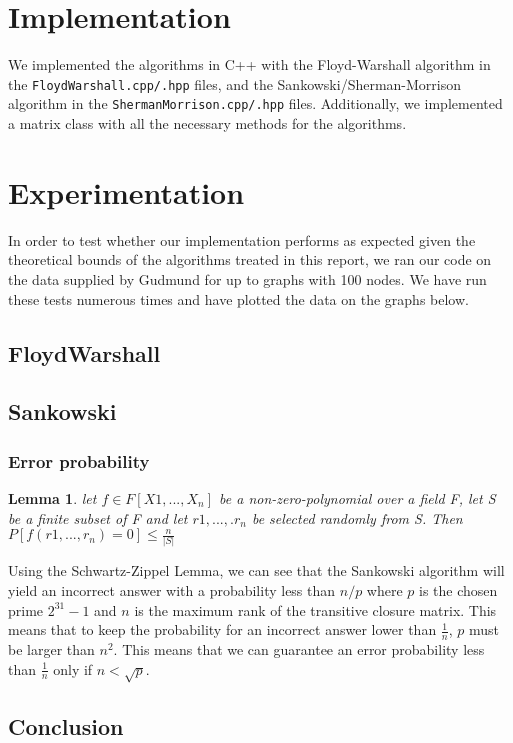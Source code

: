 \documentclass[a4paper,oneside,article]{memoir}
\newtheorem{Lemma}{Lemma}
\begin{document}
\section{Implementation}
We implemented the algorithms in C++ with the Floyd-Warshall algorithm
in the \texttt{FloydWarshall.cpp/.hpp} files, and the
Sankowski/Sherman-Morrison algorithm in the
\texttt{ShermanMorrison.cpp/.hpp} files. Additionally, we implemented
a matrix class with all the necessary methods for the algorithms.

\section{Experimentation}
In order to test whether our implementation performs as expected given
the theoretical bounds of the algorithms treated in this report, we
ran our code on the data supplied by Gudmund for up to graphs with 100 nodes.
We have run these tests numerous times and have plotted the data on the graphs below.


\subsection{FloydWarshall}

\subsection{Sankowski}

\subsubsection{Error probability}
\begin{Lemma}
let $f \in F[X1, ...,X_n]$ be a non-zero-polynomial over a field F, let S be a finite subset of F and let $r1,...,.r_n$ be selected randomly from S.
Then $P[f(r1,...,r_n)=0]\leq \frac{n}{|S|}$
\end{Lemma}
Using the Schwartz-Zippel Lemma, we can see that the Sankowski algorithm will yield an incorrect answer with a probability less than $n/p$ where $p$ is the chosen prime $2^{31}-1$ and $n$ is the maximum rank of the transitive closure matrix.
This means that to keep the probability for an incorrect answer lower than $\frac{1}{n}$, $p$ must be larger than $n^2$. This means that we can guarantee an error probability less than $\frac{1}{n}$ only if $n < \sqrt{p}$.


\subsection{Conclusion}
\end{document}
